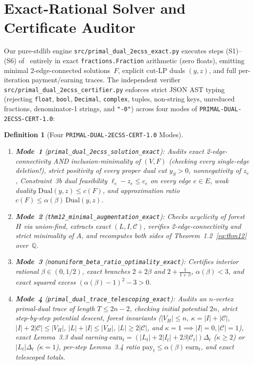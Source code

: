 \documentclass[11pt,twocolumn]{article}
\newtheorem{definition}{Definition}
\newcommand{\QQ}{\mathbb{Q}}
\begin{document}
\section{Exact-Rational Solver and Certificate Auditor}\label{sec:certifier}
Our pure-stdlib engine \texttt{src/primal\_dual\_2ecss\_exact.py} executes steps (S1)--(S6) of~\cite{danciu2026twoconnected} entirely in exact \texttt{fractions.Fraction} arithmetic (zero floats), emitting minimal 2-edge-connected solutions~$F$, explicit cut-LP duals $(y, z)$, and full per-iteration payment/earning traces. The independent verifier \texttt{src/primal\_dual\_2ecss\_certifier.py} enforces strict JSON AST typing (rejecting \texttt{float}, \texttt{bool}, \texttt{Decimal}, \texttt{complex}, tuples, non-string keys, unreduced fractions, denominator-1 strings, and \texttt{"-0"}) across four modes of \texttt{PRIMAL-DUAL-2ECSS-CERT-1.0}:

\begin{definition}[Four \texttt{PRIMAL-DUAL-2ECSS-CERT-1.0} Modes]\label{def:modes}
\leavevmode
\begin{enumerate}[leftmargin=*,nosep]
  \item \textbf{Mode~1} (\texttt{\small primal\_\allowbreak dual\_\allowbreak 2ecss\_\allowbreak solution\_\allowbreak exact}): Audits exact 2-edge-connectivity AND inclusion-minimality of $(V, F)$ (checking every single-edge deletion!), strict positivity of every proper dual cut $y_S > 0$, nonnegativity of $z_e$, Constraint~3b dual feasibility $\ell_e - z_e \le c_e$ on every edge $e \in E$, weak duality $\mathrm{Dual}(y,z) \le c(F)$, and approximation ratio $c(F) \le \alpha(\beta)\,\mathrm{Dual}(y,z)$.
  \item \textbf{Mode~2} (\texttt{\small thm12\_\allowbreak minimal\_\allowbreak augmentation\_\allowbreak exact}): Checks acyclicity of forest~$H$ via union-find, extracts exact $(L, I, \mathcal{C})$, verifies 2-edge-connectivity and strict minimality of $A$, and recomputes both sides of Theorem~1.2~\eqref{eq:thm12} over~$\QQ$.
  \item \textbf{Mode~3} (\texttt{\small nonuniform\_\allowbreak beta\_\allowbreak ratio\_\allowbreak optimality\_\allowbreak exact}): Certifies interior rational $\beta \in (0, 1/2)$, exact branches $2+2\beta$ and $2+\frac{1}{1+\beta}$, $\alpha(\beta) < 3$, and exact squared excess $(\alpha(\beta)-1)^2 - 3 > 0$.
  \item \textbf{Mode~4} (\texttt{\small primal\_\allowbreak dual\_\allowbreak trace\_\allowbreak telescoping\_\allowbreak exact}): Audits an $n$-vertex primal-dual trace of length $T \le 2n - 2$, checking initial potential $2n$, strict step-by-step potential descent, forest invariants ($|V_H| \le n$, $\kappa = |I| + |\mathcal{C}|$, $|I| + 2|\mathcal{C}| \le |V_H|$, $|L| + |I| \le |V_H|$, $|L| \ge 2|\mathcal{C}|$, and $\kappa = 1 \implies |I|=0, |\mathcal{C}|=1$), exact Lemma~3.3 dual earning $\mathrm{earn}_t = (|L_t| + 2|I_t| + 2\beta|\mathcal{C}_t|)\Delta_t$ ($\kappa \ge 2$) or $|L_t|\Delta_t$ ($\kappa = 1$), per-step Lemma~3.4 ratio $\mathrm{pay}_t \le \alpha(\beta)\,\mathrm{earn}_t$, and exact telescoped totals.
\end{enumerate}
\end{definition}
\end{document}
